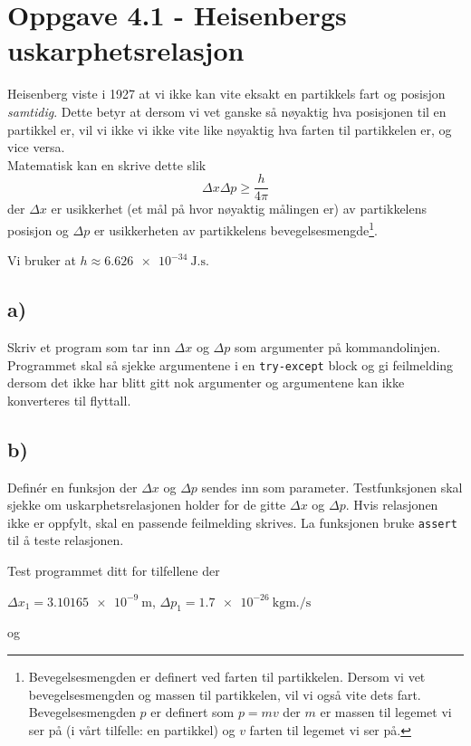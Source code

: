 \documentclass[10pt,a4paper]{article}
\begin{document}
\section*{Oppgave 4.1 - Heisenbergs uskarphetsrelasjon}
Heisenberg viste i 1927 at vi ikke kan vite eksakt en partikkels fart og posisjon \textit{samtidig}. Dette betyr at dersom vi vet ganske så nøyaktig hva posisjonen til en partikkel er, vil vi ikke vi ikke vite like nøyaktig hva farten til partikkelen er, og vice versa. \\
Matematisk kan en skrive dette slik
\[
\Delta x \Delta p \geq \frac{h}{4\pi}
\]
der $\Delta x$ er usikkerhet (et mål på hvor nøyaktig målingen er) av partikkelens posisjon og $\Delta p$ er usikkerheten av partikkelens bevegelsesmengde\footnote{Bevegelsesmengden er definert ved farten til partikkelen. Dersom vi vet bevegelsesmengden og massen til partikkelen, vil vi også vite dets fart. Bevegelsesmengden $p$  er definert som $p = mv$ der $m$ er massen til legemet vi ser på (i vårt tilfelle: en partikkel) og $v$ farten til legemet vi ser på.}.
 
Vi bruker at $h \approx \SI{6.626e-34}{\joule.\second}$.
 
\subsection*{a)}
Skriv et program som tar inn $\Delta x$ og $\Delta p$ som argumenter på kommandolinjen. Programmet skal så sjekke argumentene i en \texttt{try-except} block og gi feilmelding dersom det ikke har blitt gitt nok argumenter og argumentene kan ikke konverteres til flyttall. 
 
\subsection*{b)}
Definér en funksjon der $\Delta x$ og $\Delta p$ sendes inn som parameter. Testfunksjonen skal sjekke om uskarphetsrelasjonen holder for de gitte $\Delta x$ og $\Delta p$. Hvis relasjonen ikke er oppfylt, skal en passende feilmelding skrives. La funksjonen bruke \texttt{assert} til å teste relasjonen.
 
Test programmet ditt for tilfellene der 
 
$\Delta x_1 = \SI{3.10165e-9}{\m}$, $\Delta p_1 = \SI{1.7e-26}{\kg \meter .\per \second}$ 
 
og 
 
\end{document}

